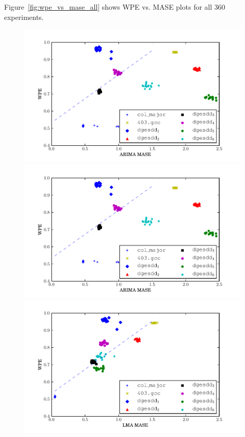Figure~\ref{fig:wpe_vs_mase_all} shows WPE vs. MASE plots for all 360
experiments.
\begin{figure}
  \centering
    \includegraphics[width=\columnwidth]{figs/ARIMA_prediction_vs_entropy}
    \includegraphics[width=\columnwidth]{figs/ARIMA_prediction_vs_entropy}
    \includegraphics[width=\columnwidth]{figs/LMA_prediction_vs_entropy}

\end{figure}
